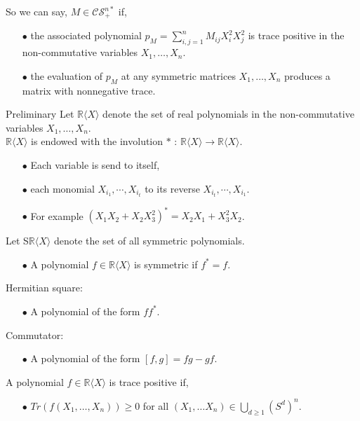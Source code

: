 \documentclass[13.5pt]{beamer}
\begin{document}
\begin{frame}
So we can say, $M\in \mathcal{CS}_+^{n*}$ if,
\begin{itemize}
\item[$\bullet$] the associated polynomial $p_M = \sum \limits_{i,j=1}^n M_{ij} X_i^2X_j^2$ is trace positive in the non-commutative variables $X_1,\ldots,X_n$.
\pause
\item[$\bullet$] the evaluation of $p_M$ at any symmetric matrices $X_1,\ldots,X_n$ produces a matrix with nonnegative trace.
\end{itemize}
\vspace*{5mm}
\end{frame}

\begin{frame}{Preliminary}
Let $\mathbb{R}\langle X \rangle$ denote the set of real polynomials in the non-commutative variables $X_1,\ldots,X_n$.\\ \vspace*{2mm}
\pause
$\mathbb{R} \langle X \rangle$ is endowed with the involution $*$ : $\mathbb{R} \langle X \rangle \rightarrow \mathbb{R} \langle X \rangle$.
\begin{itemize}
\item[$\bullet$] Each variable is send to itself,
\item[$\bullet$] each monomial $X_{i_1},\cdots, X_{i_t}$ to its reverse $X_{i_t},\cdots, X_{i_1}$.
\item[$\bullet$] For example $(X_1X_2+X_2X_3^2)^* = X_2X_1+ X_3^2X_2$.
\end{itemize}
\end{frame}

\begin{frame}
Let S$\mathbb{R} \langle X \rangle$ denote the set of all symmetric polynomials.
\begin{itemize}
\item[$\bullet$] A polynomial $f \in \mathbb{R} \langle X \rangle$  is symmetric if $f^*=f$.
\end{itemize}
\vspace*{2mm}
Hermitian square:
\begin{itemize}
\item[$\bullet$] A polynomial of the form $ff^*$.
\end{itemize}
\vspace*{2mm}
Commutator:
\begin{itemize}
\item[$\bullet$] A polynomial of the form $[f,g] = fg-gf$.
\end{itemize}
\vspace*{2mm}
A polynomial $f \in \mathbb{R} \langle X \rangle$ is trace positive if,
\begin{itemize}
\item[$\bullet$] $Tr(f(X_1, \ldots, X_n)) \geq 0$ for all $(X_1, \ldots X_n) \in \bigcup \limits_{d \geq 1} (S^d)^n$.
\end{itemize}
\end{frame}
\end{document}
